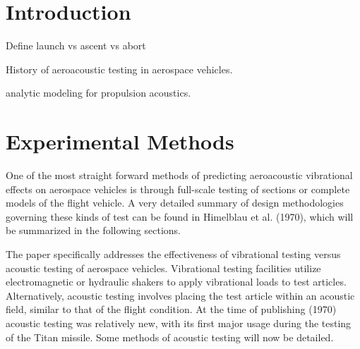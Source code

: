 \documentclass[]{aiaa-tc}%
\begin{document}





\section{Introduction} %






Define launch vs ascent vs abort



History of aeroacoustic testing in aerospace vehicles. \cite{SpaceVehicleAeroacousticVibrationPrediction}

analytic modeling for propulsion acoustics.\cite{AcousticPropulsionLoads}




\section{Experimental Methods}

One of the most straight forward methods of predicting aeroacoustic vibrational effects on aerospace vehicles is through full-scale testing of sections or complete models of the flight vehicle.  A very detailed summary of design methodologies governing these kinds of test can be found in Himelblau et al. (1970), \cite{SpaceVehicleAeroacousticVibrationPrediction} which will be summarized in the following sections.

The paper specifically addresses the effectiveness of vibrational testing versus acoustic testing of aerospace vehicles.  Vibrational testing facilities utilize electromagnetic or hydraulic shakers to apply vibrational loads to test articles.  Alternatively, acoustic testing involves placing the test article within an acoustic field, similar to that of the flight condition.  At the time of publishing (1970) acoustic testing was relatively new, with its first major usage during the testing of the Titan missile.  Some methods of acoustic testing will now be detailed.
\end{document}
